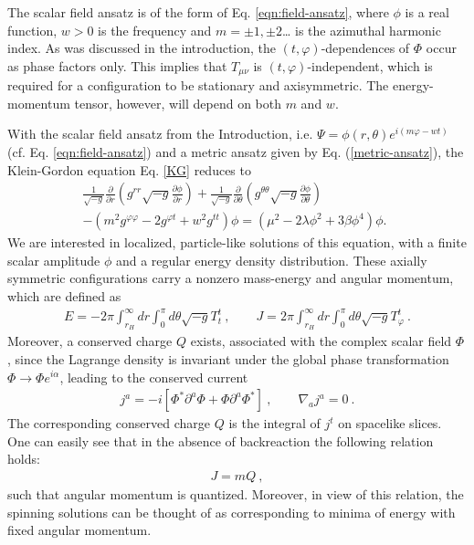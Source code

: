 The scalar field ansatz is of the form of Eq. \eqref{eqn:field-ansatz}, 
 where $\phi$ is a real function, $w>0$ is the frequency and $m=\pm 1,\pm 2$\dots
is the azimuthal harmonic index. 
As was discussed in the introduction, the $(t, \varphi)$-dependences of $\Phi$ occur as phase factors only.
This implies that $T_{\mu\nu}$ is $(t, \varphi)$-independent, which is required for
a configuration to be stationary and axisymmetric.
The energy-momentum tensor, however,  will 
 depend on both $m$ and $w$.

With the scalar field ansatz from the Introduction, i.e. $\Psi=\phi(r,\theta)e^{i(m\varphi-wt)}$ (cf. Eq. \eqref{eqn:field-ansatz}) and a metric ansatz given by Eq. (\ref{metric-ansatz}), 
the Klein-Gordon equation Eq. \eqref{KG}
reduces to
\begin{eqnarray}
\label{KG1}
\frac{1}{\sqrt{-g}}\frac{\partial}{\partial r}\left(g^{rr}\sqrt{-g}\frac{\partial \phi}{\partial r} \right)+
\frac{1}{\sqrt{-g}}\frac{\partial}{\partial \theta} \left(g^{\theta \theta}\sqrt{-g}\frac{\partial \phi}{\partial \theta} \right)
\nonumber\\
-\left(
m^2 g^{\varphi \varphi}-2g^{\varphi t} +w^2 g^{tt} 
\right)\phi
=(\mu^2-2 \lambda \phi^2+3\beta \phi^4)\phi.~{~}
\end{eqnarray}
We are interested in 
localized, particle-like solutions of this equation,
 with a finite scalar amplitude $\phi$ and a regular energy density distribution.
These axially symmetric configurations carry a nonzero 
  mass-energy and angular momentum,  which are defined as
\begin{eqnarray}
\label{scalar-charges}
E=-2\pi \int_{r_H}^\infty dr \int_0^\pi d\theta \sqrt{-g}T_t^t\ , \qquad 
J= 2\pi \int_{r_H}^\infty dr \int_0^\pi d\theta \sqrt{-g}T_\varphi^t \ .
 \end{eqnarray}
%
Moreover, a conserved charge $Q$ exists, associated with the complex scalar field $\Phi$, since the Lagrange density is invariant under the global phase transformation
$\Phi \to \Phi e^{i\alpha}$, 
 leading to the conserved current
 \begin{eqnarray}
\label{scalar-current}
j^{a}=-i\left[\Phi^* \partial^a\Phi+\Phi \partial^a\Phi^*\right]\ , \qquad \nabla_aj^{a}=0 \ .
 \end{eqnarray}
The corresponding conserved charge $Q$ is the integral of $j^t$ on spacelike slices.
One can easily see that in the absence of backreaction the following relation holds:
 \begin{eqnarray}
\label{rel1}
J=m Q\ ,
\end{eqnarray}
such that  angular momentum  is quantized.
Moreover,
in view of this relation, the spinning solutions
can be thought of as corresponding to minima of energy with fixed angular
momentum.
 

